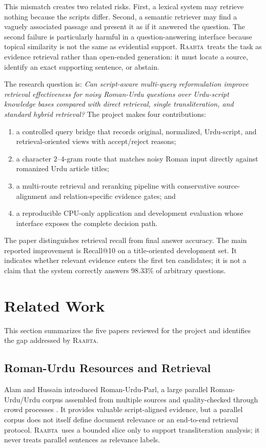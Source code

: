 \documentclass[conference]{IEEEtran}
\newcommand{\system}{\textsc{Raabta}}
\begin{document}
This mismatch creates two related risks. First, a lexical system may retrieve nothing because the scripts differ. Second, a semantic retriever may find a vaguely associated passage and present it as if it answered the question. The second failure is particularly harmful in a question-answering interface because topical similarity is not the same as evidential support. \system\ treats the task as evidence retrieval rather than open-ended generation: it must locate a source, identify an exact supporting sentence, or abstain.

The research question is: \emph{Can script-aware multi-query reformulation improve retrieval effectiveness for noisy Roman-Urdu questions over Urdu-script knowledge bases compared with direct retrieval, single transliteration, and standard hybrid retrieval?} The project makes four contributions:

\begin{enumerate}
  \item a controlled query bridge that records original, normalized, Urdu-script, and retrieval-oriented views with accept/reject reasons;
  \item a character $2$--$4$-gram route that matches noisy Roman input directly against romanized Urdu article titles;
  \item a multi-route retrieval and reranking pipeline with conservative source-alignment and relation-specific evidence gates; and
  \item a reproducible CPU-only application and development evaluation whose interface exposes the complete decision path.
\end{enumerate}

The paper distinguishes retrieval recall from final answer accuracy. The main reported improvement is Recall@10 on a title-oriented development set. It indicates whether relevant evidence enters the first ten candidates; it is not a claim that the system correctly answers 98.33\% of arbitrary questions.

\section{Related Work}
This section summarizes the five papers reviewed for the project and identifies the gap addressed by \system.

\subsection{Roman-Urdu Resources and Retrieval}
Alam and Hussain introduced Roman-Urdu-Parl, a large parallel Roman-Urdu/Urdu corpus assembled from multiple sources and quality-checked through crowd processes \cite{alam2022parallel}. It provides valuable script-aligned evidence, but a parallel corpus does not itself define document relevance or an end-to-end retrieval protocol. \system\ uses a bounded slice only to support transliteration analysis; it never treats parallel sentences as relevance labels.
\end{document}
